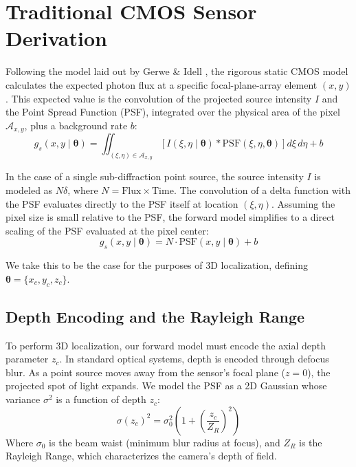 \documentclass[11pt]{article}
\begin{document}
\section{Traditional CMOS Sensor Derivation}

Following the model laid out by Gerwe \& Idell \cite{gerwe2003cramer}, the rigorous static CMOS model calculates the expected photon flux at a specific focal-plane-array element $(x, y)$. This expected value is the convolution of the projected source intensity $I$ and the Point Spread Function (PSF), integrated over the physical area of the pixel $\mathcal{A}_{x,y}$, plus a background rate $b$:
\begin{equation}
g_s(x,y \mid \bm{\theta}) = \iint_{(\xi, \eta) \in \mathcal{A}_{x,y}} \left[ I(\xi, \eta \mid \bm{\theta}) * \text{PSF}(\xi, \eta, \bm{\theta}) \right] d\xi \, d\eta + b
\end{equation}

In the case of a single sub-diffraction point source, the source intensity $I$ is modeled as $N\delta$, where $N = \text{Flux} \times \text{Time}$. The convolution of a delta function with the PSF evaluates directly to the PSF itself at location $(\xi, \eta)$. Assuming the pixel size is small relative to the PSF, the forward model simplifies to a direct scaling of the PSF evaluated at the pixel center:
\begin{equation}
g_s(x,y \mid \bm{\theta}) = N \cdot \text{PSF}(x, y \mid \bm{\theta}) + b
\end{equation}

We take this to be the case for the purposes of 3D localization, defining $\bm{\theta} = \{x_c, y_c, z_c\}$.

\subsection{Depth Encoding and the Rayleigh Range}
To perform 3D localization, our forward model must encode the axial depth parameter $z_c$. In standard optical systems, depth is encoded through defocus blur. As a point source moves away from the sensor's focal plane ($z=0$), the projected spot of light expands. We model the PSF as a 2D Gaussian whose variance $\sigma^2$ is a function of depth $z_c$:
\begin{equation}
\sigma(z_c)^2 = \sigma_0^2 \left( 1 + \left(\frac{z_c}{Z_R}\right)^2 \right)
\end{equation}
Where $\sigma_0$ is the beam waist (minimum blur radius at focus), and $Z_R$ is the Rayleigh Range, which characterizes the camera's depth of field. 
\end{document}
